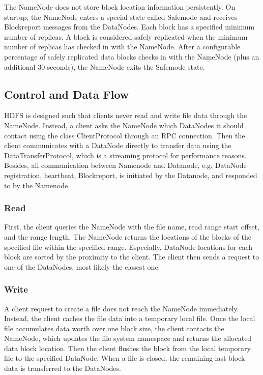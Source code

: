 \documentclass[12pt]{book}
\begin{document}
The NameNode does not store block location information persistently. On startup, the NameNode enters a special state called Safemode and receives Blockreport messages from the DataNodes. Each block has a specified minimum number of replicas. A block is considered safely replicated when the minimum number of replicas has checked in with the NameNode. After a configurable percentage of safely replicated data blocks checks in with the NameNode (plus an additional 30 seconds), the NameNode exits the Safemode state.

\subsection{Control and Data Flow}
HDFS is designed such that clients never read and write file data through the NameNode. Instead, a client asks the NameNode which DataNodes it should contact using the class ClientProtocol through an RPC connection. Then the client communicates with a DataNode directly to transfer data using the DataTransferProtocol, which is a streaming protocol for performance reasons. Besides, all communication between Namenode and Datanode, e.g. DataNode registration, heartbeat, Blockreport, is initiated by the Datanode, and responded to by the Namenode.

\subsubsection{Read}
First, the client queries the NameNode with the file name, read range start offset, and the range length. The NameNode returns the locations of the blocks of the specified file within the specified range. Especially, DataNode locations for each block are sorted by the proximity to the client. The client then sends a request to one of the DataNodes, most likely the closest one.

\subsubsection{Write}
A client request to create a file does not reach the NameNode immediately. Instead, the client caches the file data into a temporary local file. Once the local file accumulates data worth over one block size, the client contacts the NameNode, which updates the file system namespace and returns the allocated data block location. Then the client flushes the block from the local temporary file to the specified DataNode. When a file is closed, the remaining last block data is transferred to the DataNodes.
\end{document}
